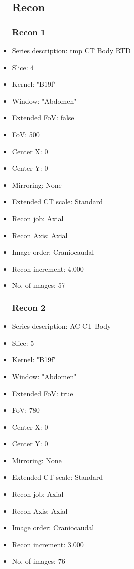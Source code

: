 \documentclass[12pt]{article}
\begin{document}
\begin{itemize}
\subsection{Recon}

\subsubsection{Recon 1}
\item Series description: tmp CT Body RTD
\item Slice: 4
\item Kernel: "B19f"
\item Window: "Abdomen"
\item Extended FoV: false
\item FoV: 500
\item Center X: 0
\item Center Y: 0
\item Mirroring: None
\item Extended CT scale: Standard
\item Recon job: Axial
\item Recon Axis: Axial
\item Image order: Craniocaudal
\item Recon increment: 4.000
\item No. of images: 57
\subsubsection{Recon 2}
\item Series description: AC CT Body
\item Slice: 5
\item Kernel: "B19f"
\item Window: "Abdomen"
\item Extended FoV: true
\item FoV: 780
\item Center X: 0
\item Center Y: 0
\item Mirroring: None
\item Extended CT scale: Standard
\item Recon job: Axial
\item Recon Axis: Axial
\item Image order: Craniocaudal
\item Recon increment: 3.000
\item No. of images: 76

\end{itemize}
\end{document}
